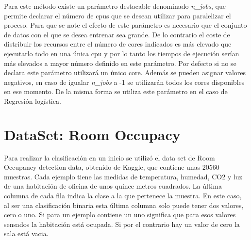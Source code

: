 \documentclass[a4paper, 12pt]{book}
\begin{document}
Para este método existe un parámetro destacable denominado \textit{n\_jobs}, que permite declarar el número de cpus que se desean utilizar para paralelizar el proceso. Para que se note el efecto de este parámetro es necesario que el conjunto de datos con el que se desea entrenar sea grande. De lo contrario el coste de distribuir los recursos entre el número de cores indicados es más elevado que ejecutarlo todo en una única cpu y por lo tanto los tiempos de ejecución serían más elevados a mayor número definido en este parámetro.
Por defecto si no se declara este parámetro utilizará un único core. Además se pueden asignar valores negativos, en caso de igualar \textit{n\_jobs} a -1 se utilizarán todos los cores disponibles en ese momento. De la misma forma se utiliza este parámetro en el caso de Regresión logística.

\section{DataSet: Room Occupacy}

Para realizar la clasificación en un inicio se utilizó el data set de Room Occupancy detection data\cite{DataSetOccupancy}, obtenido de Kaggle, que contiene unas 20560 muestras. Cada ejemplo tiene las medidas de temperatura, humedad, CO2 y luz de una habitación de oficina de unos quince metros cuadrados. La última columna de cada fila indica la clase a la que pertenece la muestra. En este caso, al ser una clasificación binaria esta última columna solo puede tener dos valores, cero o uno. Si para un ejemplo contiene un uno significa que para esos valores sensados la habitación está ocupada. Si por el contrario hay un valor de cero la sala está vacia. 
\end{document}
